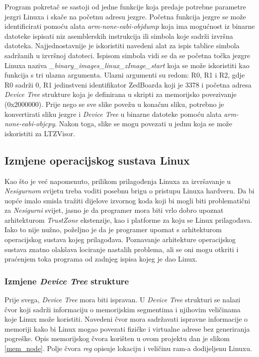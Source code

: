 \documentclass[times, utf8, diplomski, numeric]{fer}
\begin{document}
Program pokretač se sastoji od jedne funkcije koja predaje potrebne parametre jezgri Linuxa i skače na početnu adresu jezgre.
Početna funkcija jezgre se može identificirati pomoću alata \textit{arm-none-eabi-objdump} koja ima mogućnost iz binarne
datoteke ispisati niz asemblerskih instrukcija ili simbola koje sadrži izvršna datoteka. Najjednostavnije je iskoristiti
navedeni alat za ispis tablice simbola sadržanih u izvršnoj datoteci. Ispisom simbola vidi se da se početna točka jezgre
Linuxa naziva \textit{\_binary\_images\_linux\_zImage\_start} koja se može iskoristiti kao funkcija s tri ulazna argumenta.
Ulazni argumenti su redom: R0, R1 i R2, gdje R0 sadrži 0, R1 jedinstveni identifikator ZedBoarda koji je 3378 i početna adresa
\textit{Device Tree} strukture koja je definirana u skripti za memorijsko povezivanje (0x2000000). Prije nego se sve slike
povežu u konačnu sliku, potrebno je konvertirati sliku jezgre i \textit{Device Tree} u binarne datoteke pomoću alata
\textit{arm-none-eabi-objcpy}. Nakon toga, slike se mogu povezati u jednu koja se može iskoristiti za LTZVisor.

\subsection{Izmjene operacijskog sustava Linux}
Kao što je već napomenuto, prilikom prilagođenja Linuxa za izvršavanje u \textit{Nesigurnom} svijetu treba voditi posebnu brigu o
pristupu Linuxa hardveru. Da bi uopće imalo smisla tražiti dijelove izvornog koda koji bi mogli biti problematični za
\textit{Nesigurni} svijet, jasno je da programer mora biti vrlo dobro upoznat arhitekturom \textit{TrustZone} ekstenzije, kao i
platforme za koju se Linux prilagođava. Iako to nije nužno, poželjno je da je programer upoznat s arhitekturom operacijskog
sustava kojeg prilagođava. Poznavanje arhitekture operacijskog sustava znatno olakšava lociranje nastalih problema, ali se
oni mogu otkriti i praćenjem toka programa od zadnjeg ispisa kojeg je dao Linux.

\subsubsection{Izmjene \textit{Device Tree} strukture}
Prije svega, \textit{Device Tree} mora biti ispravan. U \textit{Device Tree} strukturi se nalazi čvor koji sadrži informaciju
o memorijskim segmentima i njihovim veličinama koje Linux može koristiti. Navedeni čvor mora sadržavati ispravne informacije
o memoriji kako bi Linux mogao povezati fizičke i virtualne adrese bez generiranja pogreške. Opis memorijskog čvora korišten
u ovom projektu dan je slikom \ref{mem_node}. Polje čvora \textit{reg} opisuje lokaciju i veličinu \gls{ram}-a dodijeljenu Linuxu.
\end{document}
